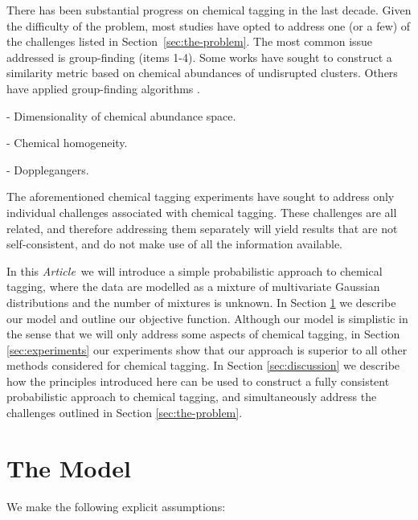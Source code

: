 \documentclass{aastex61}
\newcommand{\article}{\emph{Article}}
\begin{document}
There has been substantial progress on chemical tagging in the last decade.
Given the difficulty of the problem, most studies have opted to address one
(or a few) of the challenges listed in Section~\ref{sec:the-problem}. 
The most common issue addressed is group-finding (items 1-4). 
Some works have sought to construct a similarity metric \citep{Mitschang}
based on chemical abundances of undisrupted clusters. 
Others have applied group-finding algorithms \citep{Hogg,Gregor}.

- Dimensionality of chemical abundance space.

- Chemical homogeneity.

- Dopplegangers.


The aforementioned chemical tagging experiments have sought to address only 
individual challenges associated with chemical tagging.
These challenges are all related, and therefore addressing them separately
will yield results that are not self-consistent, and do not make use of all
the information available.


In this \article\ we will introduce a simple probabilistic approach to
chemical tagging, where the data are modelled as a mixture of multivariate
Gaussian distributions and the number of mixtures is unknown.
In Section \ref{sec:the-model} we describe our model and outline our objective
function.
Although our model is simplistic in the sense that we will only address some
aspects of chemical tagging, in Section \ref{sec:experiments} our experiments
show that our approach is superior to all other methods considered 
for chemical tagging.
In Section \ref{sec:discussion} we describe how the principles introduced here
can be used to construct a fully consistent probabilistic approach to chemical
tagging, and simultaneously address the challenges outlined in Section 
\ref{sec:the-problem}.


\section{The Model}
\label{sec:the-model}


We make the following explicit assumptions:
\end{document}
